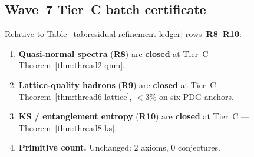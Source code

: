 \subsection{Wave~7 Tier~C batch certificate}
\label{sec:wave7-tierc:closure}

\begin{corollary}
\label{cor:thread-tierc-wave7-closure}
Relative to Table~\ref{tab:residual-refinement-ledger} rows~\textbf{R8--R10}:
\begin{enumerate}[label=(\roman*),leftmargin=*]
  \item \textbf{Quasi-normal spectra}
    (\textbf{R8}) are \textbf{closed} at Tier~C ---
    Theorem~\ref{thm:thread2-qnm}.
  \item \textbf{Lattice-quality hadrons}
    (\textbf{R9}) are \textbf{closed} at Tier~C ---
    Theorem~\ref{thm:thread6-lattice}, $<3\%$ on six PDG anchors.
  \item \textbf{KS / entanglement entropy}
    (\textbf{R10}) are \textbf{closed} at Tier~C ---
    Theorem~\ref{thm:thread8-ks}.
  \item \textbf{Primitive count.}
    Unchanged: $2$ axioms, $0$ conjectures.
\end{enumerate}
\end{corollary}